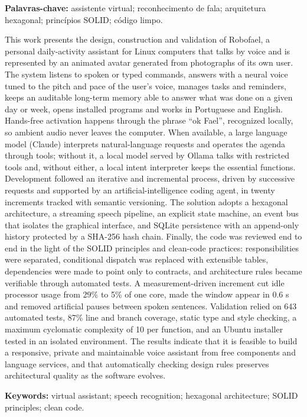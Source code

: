 \vspace{12pt}
\noindent\textbf{Palavras-chave:} assistente virtual; reconhecimento de fala; arquitetura hexagonal;
princípios SOLID; código limpo.

\begin{idiomaestrangeiro}
\noindent
This work presents the design, construction and validation of Robofael, a personal daily-activity
assistant for Linux computers that talks by voice and is represented by an animated avatar generated
from photographs of its own user. The system listens to spoken or typed commands, answers with a neural
voice tuned to the pitch and pace of the user's voice, manages tasks and reminders, keeps an auditable
long-term memory able to answer what was done on a given day or week, opens installed programs and works
in Portuguese and English. Hands-free activation happens through the phrase “ok Fael”, recognized
locally, so ambient audio never leaves the computer. When available, a large language model (Claude)
interprets natural-language requests and operates the agenda through tools; without it, a local model
served by Ollama talks with restricted tools and, without either, a local intent interpreter keeps the
essential functions. Development followed an iterative and incremental process,
driven by successive requests and supported by an artificial-intelligence coding agent, in twenty
increments tracked with semantic versioning. The solution adopts a hexagonal architecture, a streaming
speech pipeline, an explicit state machine, an event bus that isolates the graphical interface, and
SQLite persistence with an append-only history protected by a SHA-256 hash chain. Finally, the code was
reviewed end to end in the light of the SOLID principles and clean-code practices: responsibilities were
separated, conditional dispatch was replaced with extensible tables, dependencies were made to point only
to contracts, and architecture rules became verifiable through automated tests. A measurement-driven
increment cut idle processor usage from 29\% to 5\% of one core, made the window appear in 0.6 s and
removed artificial pauses between spoken sentences. Validation relied on
643 automated tests, 87\% line and branch coverage, static type and style checking, a maximum cyclomatic
complexity of 10 per function, and an Ubuntu installer tested in an isolated environment. The results
indicate that it is feasible to build a responsive, private and maintainable voice assistant from free
components and language services, and that automatically checking design rules preserves architectural
quality as the software evolves.

\vspace{12pt}
\noindent\textbf{Keywords:} virtual assistant; speech recognition; hexagonal architecture; SOLID
principles; clean code.
\end{idiomaestrangeiro}

